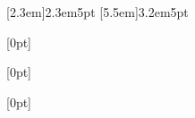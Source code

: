 

\usepackage{booktabs}
\usepackage{titletoc}%
\usepackage{tocloft} %
\usepackage{zhnumber}
\usepackage[font=small]{caption}

\contentsmargin{0pt}
\renewcommand\contentspage{\thecontentspage}

[2.3em]{}{2.3em}{5pt}
[5.5em]{}{3.2em}{5pt}


[0pt]%
{}%
{\bfseries\chaptername\ \thecontentslabel\quad}%
{}%
{\bfseries\dotfill\contentspage\\\vspace{0mm}}%

[0pt]%
{}%
{\bfseries\ \thecontentslabel\quad}%
{}%
{\bfseries\dotfill\contentspage\\\vspace{0mm}}%

[0pt]%
{}%
{\hspace{2mm}\bfseries\ \thecontentslabel\quad}%
{}%
{\bfseries\dotfill\contentspage\\\vspace{0mm}}%

\newcommand*{\noaddvspace}{\renewcommand*{\addvspace}[1]{}}
\addtocontents{lof}{\protect\noaddvspace}
\addtocontents{lot}{\protect\noaddvspace}

\usepackage{xeCJK}
\usepackage{ctex}

\usepackage{mfirstuc}

\usepackage{graphicx}
\graphicspath{ {Images/} }
\usepackage{caption}
\usepackage{subcaption}
\renewcommand{\figurename}{圖}

\renewcommand{\tablename}{表}

\usepackage[a4paper,top=2.54cm,bottom=2.54cm, left=3cm, right=3cm]{geometry}


